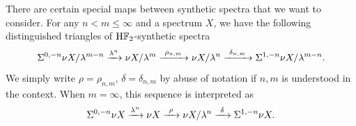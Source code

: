 \begin{notation} \label{not:deltaandrho}
There are certain special maps between synthetic spectra that we want to consider. For any $n<m\le \infty$ and a spectrum $X$, we have the following  distinguished triangles of $\mathrm{H}{\mathbb F}_2$-synthetic spectra
$$\Sigma^{0,-n}\nu X/\lambda^{m-n}\xrightarrow{\lambda^n} \nu X/\lambda^m\xrightarrow{~\rho_{n,m}~} \nu X/\lambda^n\xrightarrow{~\delta_{n,m}~} \Sigma^{1,-n}\nu X/\lambda^{m-n}.$$
We simply write $\rho=\rho_{n,m}$, $\delta=\delta_{n,m}$ by abuse of notation if $n,m$ is understood in the context.
When $m=\infty$, this sequence is interpreted  as
$$\Sigma^{0,-n}\nu X\xrightarrow{\lambda^n} \nu X\xrightarrow{~\rho~} \nu X/\lambda^n\xrightarrow{~\delta~} \Sigma^{1,-n}\nu X.$$


\end{notation}



